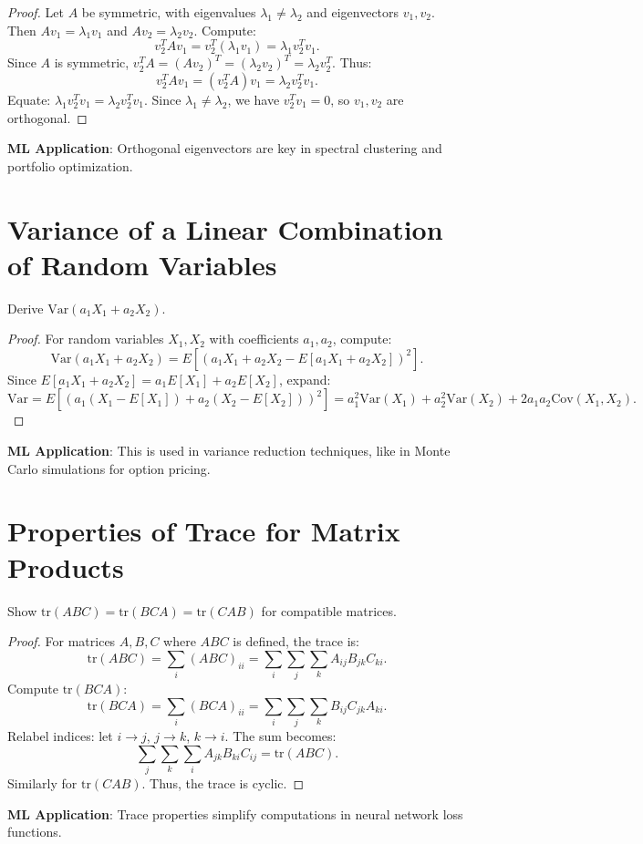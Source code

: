 \documentclass{article}
\theoremstyle{plain}
\theoremstyle{definition}
\newtheorem{proof}
\begin{document}
\begin{proof}
Let $A$ be symmetric, with eigenvalues $\lambda_1 \neq \lambda_2$ and eigenvectors $v_1, v_2$. Then $A v_1 = \lambda_1 v_1$ and $A v_2 = \lambda_2 v_2$. Compute:
\[
v_2^T A v_1 = v_2^T (\lambda_1 v_1) = \lambda_1 v_2^T v_1.
\]
Since $A$ is symmetric, $v_2^T A = (A v_2)^T = (\lambda_2 v_2)^T = \lambda_2 v_2^T$. Thus:
\[
v_2^T A v_1 = (v_2^T A) v_1 = \lambda_2 v_2^T v_1.
\]
Equate: $\lambda_1 v_2^T v_1 = \lambda_2 v_2^T v_1$. Since $\lambda_1 \neq \lambda_2$, we have $v_2^T v_1 = 0$, so $v_1, v_2$ are orthogonal.
\end{proof}
\textbf{ML Application}: Orthogonal eigenvectors are key in spectral clustering and portfolio optimization.

\section{Variance of a Linear Combination of Random Variables}
Derive $\text{Var}(a_1 X_1 + a_2 X_2)$.

\begin{proof}
For random variables $X_1, X_2$ with coefficients $a_1, a_2$, compute:
\[
\text{Var}(a_1 X_1 + a_2 X_2) = E\left[(a_1 X_1 + a_2 X_2 - E[a_1 X_1 + a_2 X_2])^2\right].
\]
Since $E[a_1 X_1 + a_2 X_2] = a_1 E[X_1] + a_2 E[X_2]$, expand:
\[
\text{Var} = E\left[(a_1 (X_1 - E[X_1]) + a_2 (X_2 - E[X_2]))^2\right] = a_1^2 \text{Var}(X_1) + a_2^2 \text{Var}(X_2) + 2 a_1 a_2 \text{Cov}(X_1, X_2).
\]
\end{proof}
\textbf{ML Application}: This is used in variance reduction techniques, like in Monte Carlo simulations for option pricing.

\section{Properties of Trace for Matrix Products}
Show $\text{tr}(ABC) = \text{tr}(BCA) = \text{tr}(CAB)$ for compatible matrices.

\begin{proof}
For matrices $A, B, C$ where $ABC$ is defined, the trace is:
\[
\text{tr}(ABC) = \sum_i (ABC)_{ii} = \sum_i \sum_j \sum_k A_{ij} B_{jk} C_{ki}.
\]
Compute $\text{tr}(BCA)$:
\[
\text{tr}(BCA) = \sum_i (BCA)_{ii} = \sum_i \sum_j \sum_k B_{ij} C_{jk} A_{ki}.
\]
Relabel indices: let $i \to j$, $j \to k$, $k \to i$. The sum becomes:
\[
\sum_j \sum_k \sum_i A_{jk} B_{ki} C_{ij} = \text{tr}(ABC).
\]
Similarly for $\text{tr}(CAB)$. Thus, the trace is cyclic.
\end{proof}
\textbf{ML Application}: Trace properties simplify computations in neural network loss functions.
\end{document}
